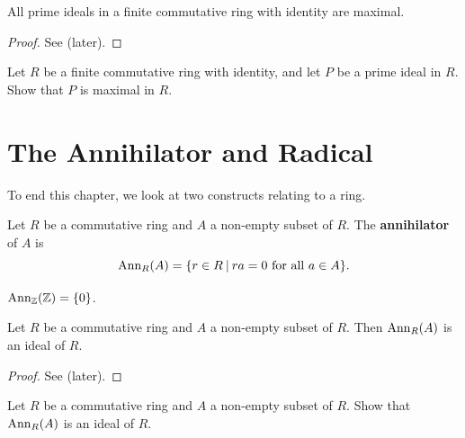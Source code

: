 \begin{corollary}\label{corollary-prime-ideal-is-maximal-in-finite-commutative-ring-with-identity}
    All prime ideals in a finite commutative ring with identity are maximal.
\end{corollary}
\begin{proof}
    See  (later).
\end{proof}
\begin{exercise}\label{exercise-prime-ideal-is-maximal-in-finite-commutative-ring-with-identity}
    Let $R$ be a finite commutative ring with identity, and let $P$ be a prime ideal in $R$. Show that $P$ is maximal in $R$.
\end{exercise}

\newpage

\section{The Annihilator and Radical}
To end this chapter, we look at two constructs relating to a ring.
\begin{definition}
    Let $R$ be a commutative ring and $A$ a non-empty subset of $R$. The \textbf{annihilator} of $A$ is
    \[
        \Ann{R}{A} = \{r \in R \vert ra = 0 \text{ for all } a \in A\}.
    \]
\end{definition}
\begin{example}
    $\mathrm{Ann}_{\mathbb{Z}}(\mathbb{Z}) = \{0\}$.
\end{example}
\begin{proposition}
    Let $R$ be a commutative ring and $A$ a non-empty subset of $R$. Then $\mathrm{Ann}_{R}(A)$ is an ideal of $R$.
\end{proposition}
\begin{proof}
    See  (later).
\end{proof}
\begin{exercise}\label{exercise-annihilator-is-an-ideal}
    Let $R$ be a commutative ring and $A$ a non-empty subset of $R$. Show that $\mathrm{Ann}_{R}(A)$ is an ideal of $R$.
\end{exercise}


